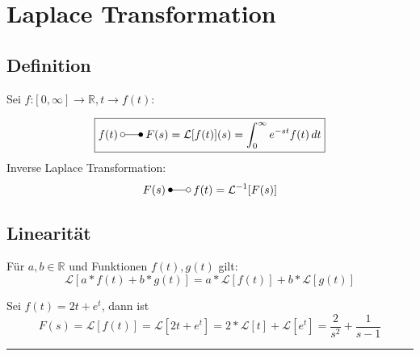 \section{Laplace Transformation}
\subsection{Definition}
Sei $f$:$[0,\infty] \rightarrow \mathbb{R}, t \rightarrow f(t)$:

\begin{equation*}
    \boxed{
    f(t)\:\laplace\:F(s)=\mathcal{L}[f(t)](s)=\int_{0}^{\infty}e^{-st}f(t)\,dt 
    }
\end{equation*}
Inverse Laplace Transformation:
\begin{equation*}
    F(s)\:\Laplace\:f(t)=\mathcal{L}^{-1}[F(s)]
\end{equation*}

\subsection{Linearität}
Für $a,b \in \mathbb{R}$ und Funktionen $f(t),g(t)$ gilt:
\begin{equation*}
    \mathcal{L}[a*f(t)+b*g(t)] = a*\mathcal{L}[f(t)]+b*\mathcal{L}[g(t)]
\end{equation*}

\begin{examplesection}[Beispiele]
    Sei $f(t)=2t+e^t$, dann ist
    \begin{equation*}
        F(s)=\mathcal{L}[f(t)]=\mathcal{L}[2t+e^t]=2*\mathcal{L}[t] + \mathcal{L}[e^t]=\frac{2}{s^2}+\frac{1}{s-1}
    \end{equation*}
    \hrule{}
\end{examplesection}
